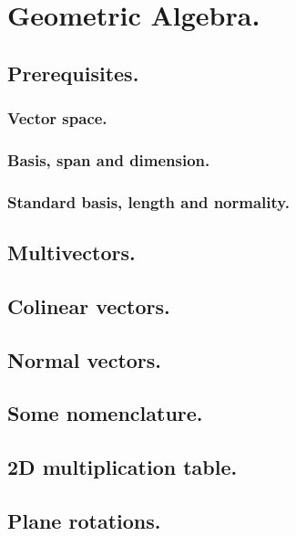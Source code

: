 %
%
\chapter{Geometric Algebra.}
   \section{Prerequisites.}
      
      \subsection{Vector space.}
         
         
         
         
      \subsection{Basis, span and dimension.}
         
      \subsection{Standard basis, length and normality.}
         
   \section{Multivectors.}
      
   \section{Colinear vectors.}
      
   \section{Normal vectors.}
      
   \section{Some nomenclature.}
      
   \section{2D multiplication table.}
      
   \section{Plane rotations.}
      
